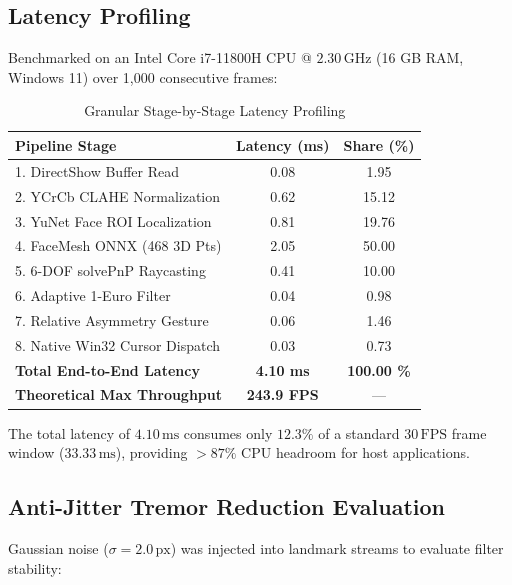 \documentclass[conference]{IEEEtran}
\begin{document}
\subsection{Latency Profiling}
Benchmarked on an Intel Core i7-11800H CPU @ $2.30\,\text{GHz}$ (16 GB RAM, Windows 11) over 1,000 consecutive frames:

\begin{table}[htbp]
\caption{Granular Stage-by-Stage Latency Profiling}
\begin{center}
\begin{tabular}{lcc}
\toprule
\textbf{Pipeline Stage} & \textbf{Latency (ms)} & \textbf{Share (\%)} \\
\midrule
1. DirectShow Buffer Read & 0.08 & 1.95 \\
2. YCrCb CLAHE Normalization & 0.62 & 15.12 \\
3. YuNet Face ROI Localization & 0.81 & 19.76 \\
4. FaceMesh ONNX (468 3D Pts) & 2.05 & 50.00 \\
5. 6-DOF solvePnP Raycasting & 0.41 & 10.00 \\
6. Adaptive 1-Euro Filter & 0.04 & 0.98 \\
7. Relative Asymmetry Gesture & 0.06 & 1.46 \\
8. Native Win32 Cursor Dispatch & 0.03 & 0.73 \\
\midrule
\textbf{Total End-to-End Latency} & \textbf{4.10 ms} & \textbf{100.00 \%} \\
\textbf{Theoretical Max Throughput} & \textbf{243.9 FPS} & — \\
\bottomrule
\end{tabular}
\end{center}
\end{table}

The total latency of $4.10\,\text{ms}$ consumes only $12.3\%$ of a standard $30\,\text{FPS}$ frame window ($33.33\,\text{ms}$), providing $>87\%$ CPU headroom for host applications.

\subsection{Anti-Jitter Tremor Reduction Evaluation}
Gaussian noise ($\sigma = 2.0\,\text{px}$) was injected into landmark streams to evaluate filter stability:
\end{document}

